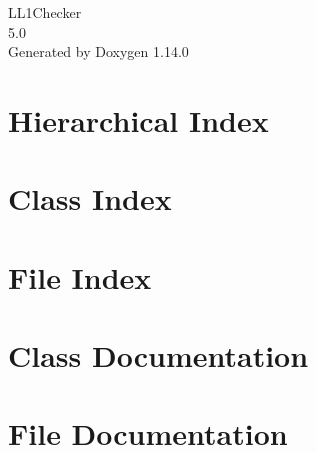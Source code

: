 \documentclass[twoside]{book}
\newcommand{\+}{\discretionary{\mbox{\scriptsize$\hookleftarrow$}}{}{}}
\newcommand{\clearemptydoublepage}{%
    \newpage{\pagestyle{empty}\cleardoublepage}%
  }
\begin{document}
  \raggedbottom
    \hypersetup{pageanchor=false,
                bookmarksnumbered=true,
                pdfencoding=unicode
               }
  \begin{titlepage}
  \vspace*{7cm}
  \begin{center}%
  {\Large LL1\+Checker}\\
  [1ex]\large 5.\+0 \\
  \vspace*{1cm}
  {\large Generated by Doxygen 1.14.0}\\
  \end{center}
  \end{titlepage}
  \clearemptydoublepage
  \tableofcontents
  \clearemptydoublepage
  \hypersetup{pageanchor=true}
\chapter{Hierarchical Index}

\chapter{Class Index}

\chapter{File Index}

\chapter{Class Documentation}









\chapter{File Documentation}






  \backmatter
  \newpage
  \clearemptydoublepage
  \printindex
\end{document}
